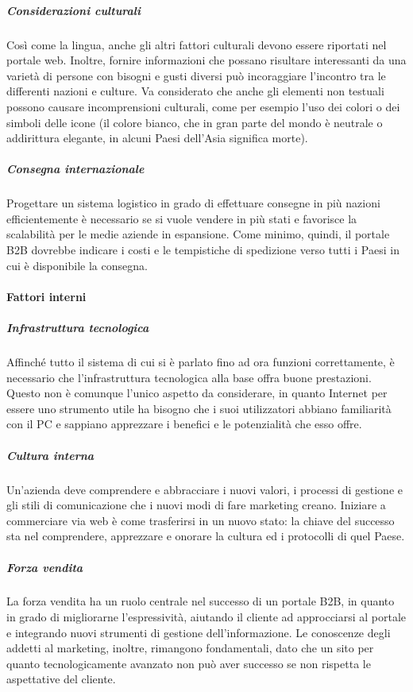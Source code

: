 \subparagraph{Considerazioni culturali}
Così come la lingua, anche gli altri fattori culturali devono essere riportati nel portale web. Inoltre, fornire informazioni che possano risultare interessanti da una varietà di persone con bisogni e gusti diversi può incoraggiare l'incontro tra le differenti nazioni e culture. Va considerato che anche gli elementi non testuali possono causare incomprensioni culturali, come per esempio l'uso dei colori o dei simboli delle icone (il colore bianco, che in gran parte del mondo è neutrale o addirittura elegante, in alcuni Paesi dell'Asia significa morte).

\subparagraph{Consegna internazionale}
Progettare un sistema logistico in grado di effettuare consegne in più nazioni efficientemente è necessario se si vuole vendere in più stati e favorisce la scalabilità per le medie aziende in espansione. Come minimo, quindi, il portale B2B dovrebbe indicare i costi e le tempistiche di spedizione verso tutti i Paesi in cui è disponibile la consegna.

\paragraph{Fattori interni}
\subparagraph{Infrastruttura tecnologica}
Affinché tutto il sistema di cui si è parlato fino ad ora funzioni correttamente, è necessario che l'infrastruttura tecnologica alla base offra buone prestazioni. Questo non è comunque l'unico aspetto da considerare, in quanto Internet per essere uno strumento utile ha bisogno che i suoi utilizzatori abbiano familiarità con il PC e sappiano apprezzare i benefici e le potenzialità che esso offre.

\subparagraph{Cultura interna}
Un'azienda deve comprendere e abbracciare i nuovi valori, i processi di gestione e gli stili di comunicazione che i nuovi modi di fare marketing creano. Iniziare a commerciare via web è come trasferirsi in un nuovo stato: la chiave del successo sta nel comprendere, apprezzare e onorare la cultura ed i protocolli di quel Paese.

\subparagraph{Forza vendita}
La forza vendita ha un ruolo centrale nel successo di un portale B2B, in quanto in grado di migliorarne l'espressività, aiutando il cliente ad approcciarsi al portale e integrando nuovi strumenti di gestione dell'informazione. Le conoscenze degli addetti al marketing, inoltre, rimangono fondamentali, dato che un sito per quanto tecnologicamente avanzato non può aver successo se non rispetta le aspettative del cliente.

